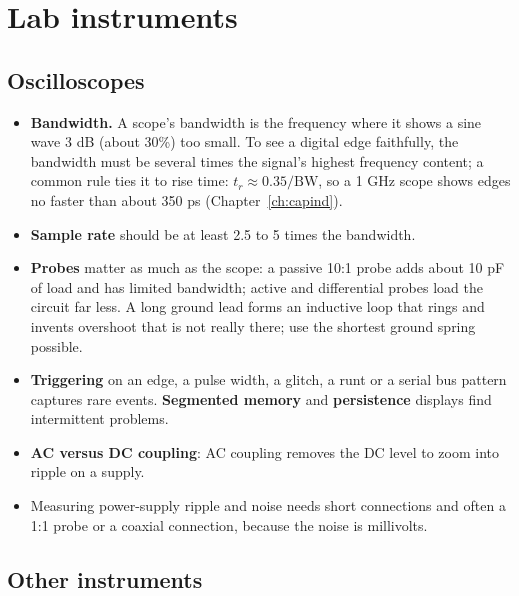 \section{Lab instruments}

\subsection*{Oscilloscopes}

\begin{itemize}
  \item \textbf{Bandwidth.} A scope's bandwidth is the frequency where it shows a sine wave 3 dB (about 30\%) too small. To see a digital edge faithfully, the bandwidth must be several times the signal's highest frequency content; a common rule ties it to rise time: $t_r \approx 0.35/\text{BW}$, so a 1 GHz scope shows edges no faster than about 350 ps (Chapter~\ref{ch:capind}).
  \item \textbf{Sample rate} should be at least 2.5 to 5 times the bandwidth.
  \item \textbf{Probes} matter as much as the scope: a passive 10:1 probe adds about 10 pF of load and has limited bandwidth; active and differential probes load the circuit far less. A long ground lead forms an inductive loop that rings and invents overshoot that is not really there; use the shortest ground spring possible.
  \item \textbf{Triggering} on an edge, a pulse width, a glitch, a runt or a serial bus pattern captures rare events. \textbf{Segmented memory} and \textbf{persistence} displays find intermittent problems.
  \item \textbf{AC versus DC coupling}: AC coupling removes the DC level to zoom into ripple on a supply.
  \item Measuring power-supply ripple and noise needs short connections and often a 1:1 probe or a coaxial connection, because the noise is millivolts.
\end{itemize}

\subsection*{Other instruments}

